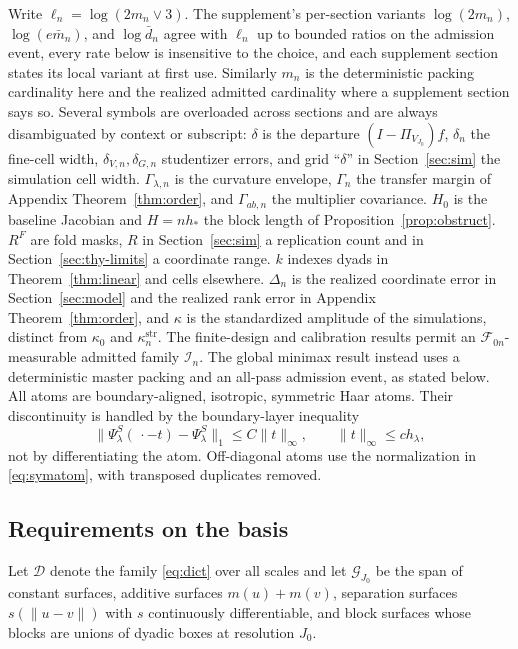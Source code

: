 \documentclass[11pt]{article}
\theoremstyle{definition}
\newcommand{\1}{\mathbf 1}\newcommand{\op}{\operatorname}
\newcommand{\cI}{\mathcal I}\newcommand{\cJ}{\mathcal J}\newcommand{\cF}{\mathcal F}
\begin{document}
Write $\ell_n=\log(2m_n\vee3)$.  The supplement's per-section variants
$\log(2m_n)$, $\log(e\bar m_n)$, and $\log\bar d_n$ agree with $\ell_n$ up to
bounded ratios on the admission event, every rate below is insensitive to the
choice, and each supplement section states its local variant at first use.
Similarly $m_n$ is the deterministic packing cardinality here and the realized
admitted cardinality where a supplement section says so.  Several symbols are
overloaded across sections and are always disambiguated by context or subscript:
$\delta$ is the departure $(I-\Pi_{V_{J_0}})f$, $\delta_n$ the fine-cell width,
$\delta_{V,n},\delta_{G,n}$ studentizer errors, and grid ``$\delta$'' in
Section~\ref{sec:sim} the simulation cell width.  $\Gamma_{\lambda,n}$ is the
curvature envelope, $\Gamma_n$ the transfer margin of
Appendix Theorem~\ref{thm:order}, and $\Gamma_{ab,n}$ the multiplier covariance.  $H_0$
is the baseline Jacobian and $H=nh_*$ the block length of
Proposition~\ref{prop:obstruct}.  $R^F$ are fold masks, $R$ in Section~\ref{sec:sim}
a replication count and in Section~\ref{sec:thy-limits} a coordinate range.  $k$ indexes
dyads in Theorem~\ref{thm:linear} and cells elsewhere.  $\Delta_n$ is the realized
coordinate error in Section~\ref{sec:model} and the realized rank error in
Appendix Theorem~\ref{thm:order}, and $\kappa$ is the standardized amplitude of the
simulations, distinct from $\kappa_0$ and $\kappa_n^{\mathrm{str}}$.  The finite-design and calibration results permit an
$\mathcal F_{0n}$-measurable admitted family $\cI_n$.  The global minimax result instead
uses a deterministic master packing and an all-pass admission event, as stated below.
All atoms are boundary-aligned, isotropic, symmetric Haar atoms.  Their discontinuity
is handled by the boundary-layer inequality
\begin{equation}
 \|\Psi_\lambda^S(\,\cdot-t)-\Psi_\lambda^S\|_1
 \le C\|t\|_\infty,
 \qquad \|t\|_\infty\le c h_\lambda,                            \label{eq:bvtranslate}
\end{equation}
not by differentiating the atom.  Off-diagonal atoms use the normalization in
\eqref{eq:symatom}, with transposed duplicates removed.

\subsection{Requirements on the basis}                    \label{sec:thy-basis}

Let $\mathcal D$ denote the family \eqref{eq:dict} over all scales and let
$\mathcal G_{J_0}$ be the span of constant surfaces, additive surfaces
$m(u)+m(v)$, separation surfaces $s(\|u-v\|)$ with $s$ continuously
differentiable, and block surfaces whose blocks are unions of dyadic boxes at
resolution $J_0$.
\end{document}
